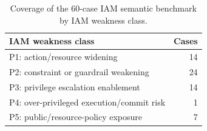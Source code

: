 \begin{table}[t]
\centering
\small
\caption{Coverage of the 60-case IAM semantic benchmark by IAM weakness class.}
\label{tab:taxonomy-coverage}
\begin{tabular}{lr}
\toprule
IAM weakness class & Cases \\
\midrule
P1: action/resource widening & 14 \\
P2: constraint or guardrail weakening & 24 \\
P3: privilege escalation enablement & 14 \\
P4: over-privileged execution/commit risk & 1 \\
P5: public/resource-policy exposure & 7 \\
\bottomrule
\end{tabular}
\end{table}

